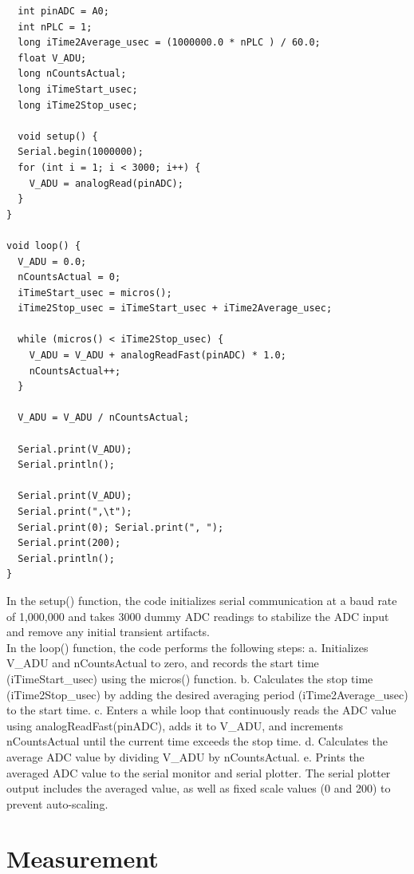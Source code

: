 \documentclass[a4paper,11pt]{article}%
\begin{document}
\begin{lstlisting}
  int pinADC = A0;
  int nPLC = 1;
  long iTime2Average_usec = (1000000.0 * nPLC ) / 60.0;
  float V_ADU;
  long nCountsActual;
  long iTimeStart_usec;
  long iTime2Stop_usec;

  void setup() {
  Serial.begin(1000000);
  for (int i = 1; i < 3000; i++) {
    V_ADU = analogRead(pinADC);
  }
}

void loop() {
  V_ADU = 0.0;
  nCountsActual = 0;
  iTimeStart_usec = micros();
  iTime2Stop_usec = iTimeStart_usec + iTime2Average_usec;

  while (micros() < iTime2Stop_usec) {
    V_ADU = V_ADU + analogReadFast(pinADC) * 1.0;
    nCountsActual++;
  }

  V_ADU = V_ADU / nCountsActual;

  Serial.print(V_ADU);
  Serial.println();

  Serial.print(V_ADU);
  Serial.print(",\t");
  Serial.print(0); Serial.print(", ");
  Serial.print(200);
  Serial.println();
}

\end{lstlisting}

In the setup() function, the code initializes serial communication at a baud rate of 1,000,000 and takes 3000 dummy ADC readings to stabilize the ADC input and remove any initial transient artifacts.\\

In the loop() function, the code performs the following steps: a. Initializes V\_ADU and nCountsActual to zero, and records the start time (iTimeStart\_usec) using the micros() function. b. Calculates the stop time (iTime2Stop\_usec) by adding the desired averaging period (iTime2Average\_usec) to the start time. c. Enters a while loop that continuously reads the ADC value using analogReadFast(pinADC), adds it to V\_ADU, and increments nCountsActual until the current time exceeds the stop time. d. Calculates the average ADC value by dividing V\_ADU by nCountsActual. e. Prints the averaged ADC value to the serial monitor and serial plotter. The serial plotter output includes the averaged value, as well as fixed scale values (0 and 200) to prevent auto-scaling.




\section{Measurement}
\end{document}
